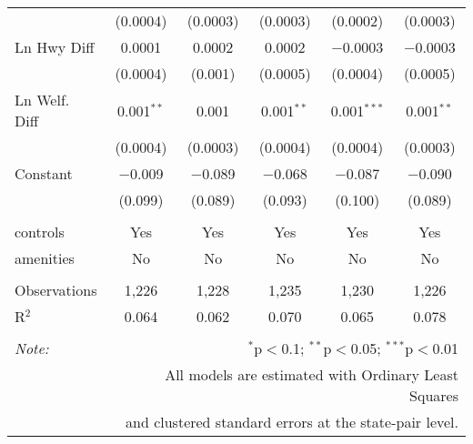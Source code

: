 \begin{table}[!htbp]
\begin{tabular}{@{\extracolsep{5pt}}lccccc}
  & (0.0004) & (0.0003) & (0.0003) & (0.0002) & (0.0003) \\ 
  Ln Hwy Diff & 0.0001 & 0.0002 & 0.0002 & $-$0.0003 & $-$0.0003 \\ 
  & (0.0004) & (0.001) & (0.0005) & (0.0004) & (0.0005) \\ 
  Ln Welf. Diff & 0.001$^{**}$ & 0.001 & 0.001$^{**}$ & 0.001$^{***}$ & 0.001$^{**}$ \\ 
  & (0.0004) & (0.0003) & (0.0004) & (0.0004) & (0.0003) \\ 
  Constant & $-$0.009 & $-$0.089 & $-$0.068 & $-$0.087 & $-$0.090 \\ 
  & (0.099) & (0.089) & (0.093) & (0.100) & (0.089) \\ 
 \hline \\[-1.8ex] 
controls & Yes & Yes & Yes & Yes & Yes \\ 
amenities & No & No & No & No & No \\ 
\hline \\[-1.8ex] 
Observations & 1,226 & 1,228 & 1,235 & 1,230 & 1,226 \\ 
R$^{2}$ & 0.064 & 0.062 & 0.070 & 0.065 & 0.078 \\ 
\hline 
\hline \\[-1.8ex] 
\textit{Note:}  & \multicolumn{5}{r}{$^{*}$p$<$0.1; $^{**}$p$<$0.05; $^{***}$p$<$0.01} \\ 
 & \multicolumn{5}{r}{All models are estimated with Ordinary Least Squares} \\ 
 & \multicolumn{5}{r}{and clustered standard errors at the state-pair level.} \\ 
\end{tabular} 
\end{table} 
